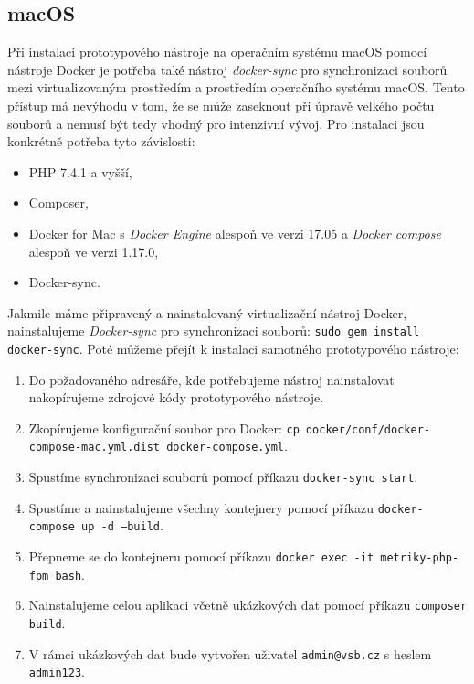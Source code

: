 \documentclass[czech,master]{diploma}
\begin{document}
\subsection{macOS}
Při instalaci prototypového nástroje na operačním systému macOS pomocí nástroje Docker je potřeba také nástroj \textit{docker-sync} pro synchronizaci souborů mezi virtualizovaným prostředím a prostředím operačního systému macOS. Tento přístup má nevýhodu v tom, že se může zaseknout při úpravě velkého počtu souborů a nemusí být tedy vhodný pro intenzivní vývoj. Pro instalaci jsou konkrétně potřeba tyto závislosti:

\begin{itemize}
\item PHP 7.4.1 a vyšší,
\item Composer,
\item Docker for Mac s \textit{Docker Engine} alespoň ve verzi 17.05 a \textit{Docker compose} alespoň ve verzi 1.17.0,
\item Docker-sync.
\end{itemize}

Jakmile máme připravený a nainstalovaný virtualizační nástroj Docker, nainstalujeme \textit{Docker-sync} pro synchronizaci souborů: \texttt{sudo gem install docker-sync}. Poté můžeme přejít k instalaci samotného prototypového nástroje:

\begin{enumerate}
\item Do požadovaného adresáře, kde potřebujeme nástroj nainstalovat nakopírujeme zdrojové kódy prototypového nástroje.
\item Zkopírujeme konfigurační soubor pro Docker: \texttt{cp docker/conf/docker-compose-mac.yml.dist docker-compose.yml}.
\item Spustíme synchronizaci souborů pomocí příkazu \texttt{docker-sync start}.
\item Spustíme a nainstalujeme všechny kontejnery pomocí příkazu \texttt{docker-compose up -d --build}.
\item Přepneme se do kontejneru pomocí příkazu \texttt{docker exec -it metriky-php-fpm bash}.
\item Nainstalujeme celou aplikaci včetně ukázkových dat pomocí příkazu \texttt{composer build}.
\item V rámci ukázkových dat bude vytvořen uživatel \texttt{admin@vsb.cz} s heslem \texttt{admin123}.
\end{enumerate}
\end{document}
